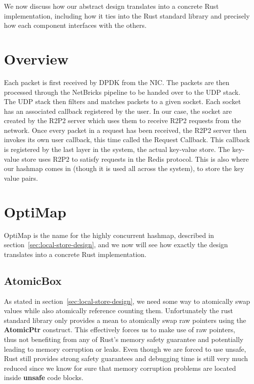 We now discuss how our abstract design translates into a concrete Rust
implementation, including how it ties into the Rust standard library
and precisely how each component interfaces with the others.

\section{Overview}

Each packet is first received by DPDK from the NIC\@. The packets are
then processed through the NetBricks pipeline to be handed over to the
UDP stack. The UDP stack then filters and matches packets to a given
socket. Each socket has an associated callback registered by the
user. In our case, the socket are created by the R2P2 server which
uses them to receive R2P2 requests from the network. Once every packet
in a request has been received, the R2P2 server then invokes its own
user callback, this time called the Request Callback. This callback
is registered by the last layer in the system, the actual key-value
store. The key-value store uses R2P2 to satisfy requests in the Redis
protocol. This is also where our hashmap comes in (though it is used
all across the system), to store the key value pairs.

\section{OptiMap} \label{sec:optimap-impl}

OptiMap is the name for the highly concurrent hashmap, described in
section~\ref{sec:local-store-design}, and we now will see how exactly
the design translates into a concrete Rust implementation.

\subsection{AtomicBox} \label{sec:atomicbox}

As stated in section~\ref{sec:local-store-design}, we need some way to
atomically swap values while also atomically reference counting them.
Unfortunately the rust standard library only provides a mean to
atomically swap raw pointers using the \textbf{AtomicPtr}
construct. This effectively forces us to make use of raw pointers,
thus not benefiting from any of Rust's memory safety guarantee and
potentially leading to memory corruption or leaks. Even though we are
forced to use unsafe, Rust still provides strong safety guarantees and
debugging time is still very much reduced since we know for sure that
memory corruption problems are located inside \textbf{unsafe} code
blocks.

